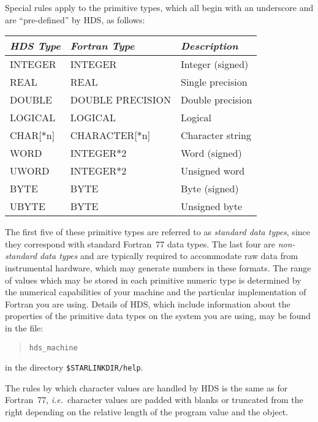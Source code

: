 \documentclass[twoside,11pt]{article}
\newcommand{\xlabel}[1]{}
\renewcommand{\_}{\texttt{\symbol{95}}}
\newcommand{\qt}[1]{``#1''}
\newcommand{\st}[1]{{\em{#1}}}
\newcommand{\astar}[0]{{$*$}}
\newcommand{\qt}[1]{{\tt{"}}#1{\tt{"}}}
\newcommand{\astar}[0]{*}
\begin{document}
Special rules apply to the primitive types, which all begin with an
underscore and are \qt{pre-defined} by HDS, as follows:

\begin{center}
\xlabel{table_of_HDS_data_types}
\begin{tabular}{|l|l|l|}
\hline
\st{HDS Type} & \st{Fortran Type} & \st{Description}\\
\hline \hline
\_INTEGER & INTEGER & Integer (signed)\\
\_REAL & REAL & Single precision\\
\_DOUBLE & DOUBLE PRECISION & Double precision\\
\_LOGICAL & LOGICAL & Logical\\
\_CHAR[{\astar}n] & CHARACTER[{\astar}n] & Character string\\
\hline
\_WORD & INTEGER{\astar}2 & Word (signed)\\
\_UWORD & INTEGER{\astar}2 & Unsigned word\\
\_BYTE & BYTE & Byte (signed)\\
\_UBYTE & BYTE & Unsigned byte\\
\hline
\end{tabular}
\end{center}

The first five of these primitive types are referred to as
\st{standard data types}, since they correspond with standard
Fortran~77 data types. The last four are \st{non-standard data types}
and are typically required to accommodate raw data from instrumental
hardware, which may generate numbers in these formats.  The range of
values which may be stored in each primitive numeric type is
determined by the numerical capabilities of your machine and the
particular implementation of Fortran you are using. Details of HDS,
which include information about the properties of the primitive data
types on the system you are using, may be found in the file:

\small
\begin{quote}
\begin{verbatim}
hds_machine
\end{verbatim}
\end{quote}
\normalsize

in the directory \texttt{\$STARLINK\_DIR/help}.

The rules by which character values are handled by HDS is the same as
for Fortran~77, \st{i.e.}\ character values are padded with blanks or
truncated from the right depending on the relative length of the
program value and the object.
\end{document}
